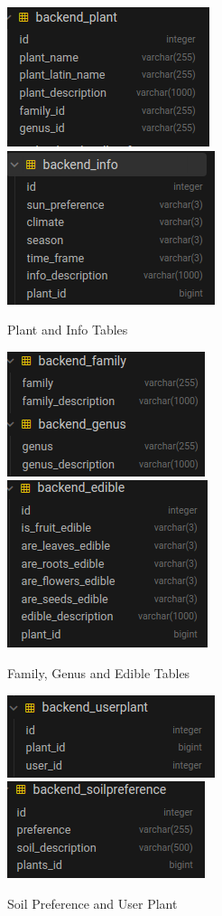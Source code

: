 \documentclass{article}
\begin{document}
        \begin{figure}[!htb]
            \centering
            \caption{Plant and Info Tables}
            \includegraphics{plant}
            \includegraphics{info2}
        \end{figure}
    
         \begin{figure}[!htb]
            \centering
            \caption{Family, Genus and Edible Tables}
            \includegraphics{family-genus}
            \includegraphics{edible}
        \end{figure}
    
         \begin{figure}[!htb]
            \centering
            \caption{Soil Preference and User Plant}
            \includegraphics{userplant}
            \includegraphics{soil_preference}
        \end{figure}
\end{document}

